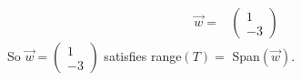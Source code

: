 \documentclass[12pt]{article}
\newenvironment{problem}[2][Problem]
{
	\begin{trivlist} 
		\item[\hskip \labelsep {\bfseries #1 #2:}]
	}
{
	\end{trivlist}
	}
\newenvironment{solution}[1][Solution]
{
	\begin{trivlist} 
		\item[\hskip \labelsep {\itshape #1:}]
	}
	{
	\end{trivlist}
}
\begin{document}
\begin{problem}{1}
\begin{solution}
\begin{align*}
\vec{w}=&\begin{pmatrix} 1\\-3 \end{pmatrix}
\end{align*}
So $\vec{w}=\begin{pmatrix} 1\\-3 \end{pmatrix}$ satisfies range$(T)=$ Span$(\vec{w})$.
\end{solution}
\end{problem}
\end{document}
